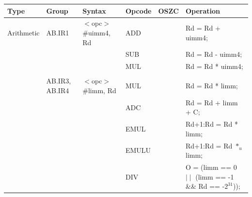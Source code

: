 \clearpage
\begin{table}
\begin{center}
\scriptsize
\setlength{\tabcolsep}{4pt}
\begin{tabular}{llllll}
\hline
Type               & Group             & Syntax                                & Opcode            & OSZC              & Operation                                                                     \\ \hline
Arithmetic         & AB.IR1            & $<$opc$>$ \#uimm4, Rd                 & ADD               & \flags{****}      & Rd = Rd + uimm4;                                                              \\
                   &                   &                                       & SUB               & \flags{****}      & Rd = Rd - uimm4;                                                              \\
                   &                   &                                       & MUL               & \flags{----}      & Rd = Rd * uimm4;                                                              \\
                   &                   &                                       &                   &                   &                                                                               \\
                   & AB.IR3, AB.IR4    & $<$opc$>$ \#limm, Rd                  & MUL               & \flags{----}      & Rd = Rd * limm;                                                               \\
                   &                   &                                       & ADC               & \flags{****}      & Rd = Rd + limm + C;                                                           \\
                   &                   &                                       & EMUL              & \flags{----}      & Rd+1:Rd = Rd * limm;                                                          \\
                   &                   &                                       & EMULU             & \flags{----}      & Rd+1:Rd = Rd $*_u$ limm;                                                      \\
                   &                   &                                       & DIV               & \flags{!---}      & O = (limm == 0 $\mid\mid$ (limm == -1 \&\& Rd == -$2^{31}$));                 \\

\end{tabular}
\end{center}
\end{table}
